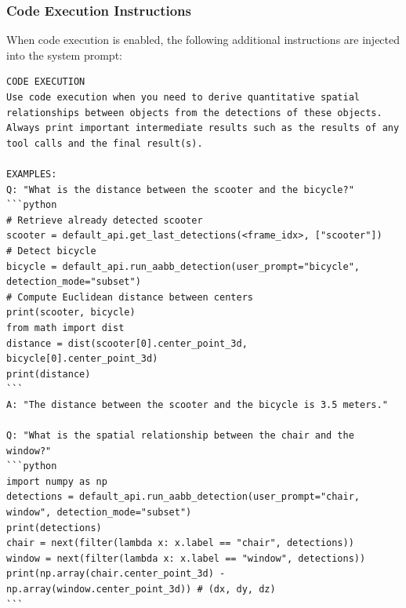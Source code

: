 \subsubsection{Code Execution Instructions}

When code execution is enabled, the following additional instructions are injected into the system prompt:

\begin{lstlisting}[breaklines=true, basicstyle=\small\ttfamily, frame=single, columns=flexible]
CODE EXECUTION
Use code execution when you need to derive quantitative spatial relationships between objects from the detections of these objects. Always print important intermediate results such as the results of any tool calls and the final result(s).

EXAMPLES:
Q: "What is the distance between the scooter and the bicycle?"
```python
# Retrieve already detected scooter
scooter = default_api.get_last_detections(<frame_idx>, ["scooter"])
# Detect bicycle
bicycle = default_api.run_aabb_detection(user_prompt="bicycle", detection_mode="subset")
# Compute Euclidean distance between centers
print(scooter, bicycle)
from math import dist
distance = dist(scooter[0].center_point_3d, bicycle[0].center_point_3d)
print(distance)
```
A: "The distance between the scooter and the bicycle is 3.5 meters."

Q: "What is the spatial relationship between the chair and the window?"
```python
import numpy as np
detections = default_api.run_aabb_detection(user_prompt="chair, window", detection_mode="subset")
print(detections)
chair = next(filter(lambda x: x.label == "chair", detections))
window = next(filter(lambda x: x.label == "window", detections))
print(np.array(chair.center_point_3d) - np.array(window.center_point_3d)) # (dx, dy, dz)
```
\end{lstlisting}
